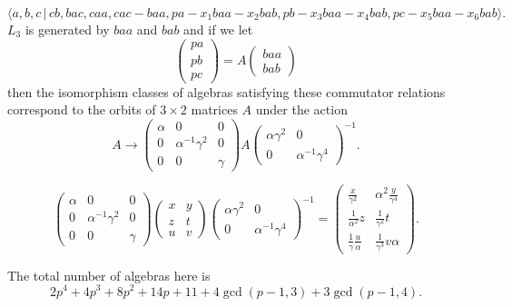 \documentclass[10pt,thmsa]{article}
\begin{document}
\[
\langle
a,b,c\,|%
\,cb,bac,caa,cac-baa,pa-x_{1}baa-x_{2}bab,pb-x_{3}baa-x_{4}bab,pc-x_{5}baa-x_{6}bab\rangle . 
\]%
$L_{3}$ is generated by $baa$ and $bab$ and if we let 
\[
\left( 
\begin{array}{l}
pa \\ 
pb \\ 
pc%
\end{array}%
\right) =A\left( 
\begin{array}{l}
baa \\ 
bab%
\end{array}%
\right) 
\]%
then the isomorphism classes of algebras satisfying these commutator
relations correspond to the orbits of $3\times 2$ matrices $A$ under the
action 
\[
A\rightarrow \left( 
\begin{array}{lll}
\alpha & 0 & 0 \\ 
0 & \alpha ^{-1}\gamma ^{2} & 0 \\ 
0 & 0 & \gamma%
\end{array}%
\right) A\left( 
\begin{array}{ll}
\alpha \gamma ^{2} & 0 \\ 
0 & \alpha ^{-1}\gamma ^{4}%
\end{array}%
\right) ^{-1}. 
\]

\[
\left( 
\begin{array}{lll}
\alpha & 0 & 0 \\ 
0 & \alpha ^{-1}\gamma ^2 & 0 \\ 
0 & 0 & \gamma%
\end{array}
\right) \left( 
\begin{array}{ll}
x & y \\ 
z & t \\ 
u & v%
\end{array}
\right) \left( 
\begin{array}{ll}
\alpha \gamma ^2 & 0 \\ 
0 & \alpha ^{-1}\gamma ^4%
\end{array}
\right) ^{-1}=\allowbreak \left( 
\begin{array}{cc}
\frac x{\gamma ^2} & \alpha ^2\frac y{\gamma ^4} \\ 
\frac 1{\alpha ^2}z & \frac 1{\gamma ^2}t \\ 
\frac 1\gamma \frac u\alpha & \frac 1{\gamma ^3}v\alpha%
\end{array}
\right) . 
\]

The total number of algebras here is 
\[
2p^{4}+4p^{3}+8p^{2}+14p+11+4\gcd (p-1,3)+3\gcd (p-1,4). 
\]
\end{document}
